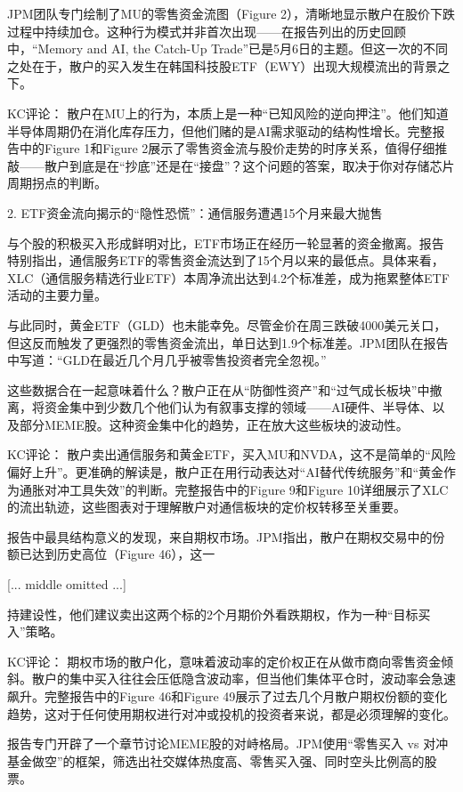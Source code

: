 \documentclass[11pt]{ctexart}
\begin{document}
JPM团队专门绘制了MU的零售资金流图（Figure 2），清晰地显示散户在股价下跌过程中持续加仓。这种行为模式并非首次出现——在报告列出的历史回顾中，“Memory and AI, the Catch-Up Trade”已是5月6日的主题。但这一次的不同之处在于，散户的买入发生在韩国科技股ETF（EWY）出现大规模流出的背景之下。

KC评论： 散户在MU上的行为，本质上是一种“已知风险的逆向押注”。他们知道半导体周期仍在消化库存压力，但他们赌的是AI需求驱动的结构性增长。完整报告中的Figure 1和Figure 2展示了零售资金流与股价走势的时序关系，值得仔细推敲——散户到底是在“抄底”还是在“接盘”？这个问题的答案，取决于你对存储芯片周期拐点的判断。

2. ETF资金流向揭示的“隐性恐慌”：通信服务遭遇15个月来最大抛售

与个股的积极买入形成鲜明对比，ETF市场正在经历一轮显著的资金撤离。报告特别指出，通信服务ETF的零售资金流达到了15个月以来的最低点。具体来看，XLC（通信服务精选行业ETF）本周净流出达到4.2个标准差，成为拖累整体ETF活动的主要力量。

与此同时，黄金ETF（GLD）也未能幸免。尽管金价在周三跌破4000美元关口，但这反而触发了更强烈的零售资金流出，单日达到1.9个标准差。JPM团队在报告中写道：“GLD在最近几个月几乎被零售投资者完全忽视。”

这些数据合在一起意味着什么？散户正在从“防御性资产”和“过气成长板块”中撤离，将资金集中到少数几个他们认为有叙事支撑的领域——AI硬件、半导体、以及部分MEME股。这种资金集中化的趋势，正在放大这些板块的波动性。

KC评论： 散户卖出通信服务和黄金ETF，买入MU和NVDA，这不是简单的“风险偏好上升”。更准确的解读是，散户正在用行动表达对“AI替代传统服务”和“黄金作为通胀对冲工具失效”的判断。完整报告中的Figure 9和Figure 10详细展示了XLC的流出轨迹，这些图表对于理解散户对通信板块的定价权转移至关重要。

报告中最具结构意义的发现，来自期权市场。JPM指出，散户在期权交易中的份额已达到历史高位（Figure 46），这一

[... middle omitted ...]

持建设性，他们建议卖出这两个标的2个月期价外看跌期权，作为一种“目标买入”策略。

KC评论： 期权市场的散户化，意味着波动率的定价权正在从做市商向零售资金倾斜。散户的集中买入往往会压低隐含波动率，但当他们集体平仓时，波动率会急速飙升。完整报告中的Figure 46和Figure 49展示了过去几个月散户期权份额的变化趋势，这对于任何使用期权进行对冲或投机的投资者来说，都是必须理解的变化。

报告专门开辟了一个章节讨论MEME股的对峙格局。JPM使用“零售买入 vs 对冲基金做空”的框架，筛选出社交媒体热度高、零售买入强、同时空头比例高的股票。
\end{document}

